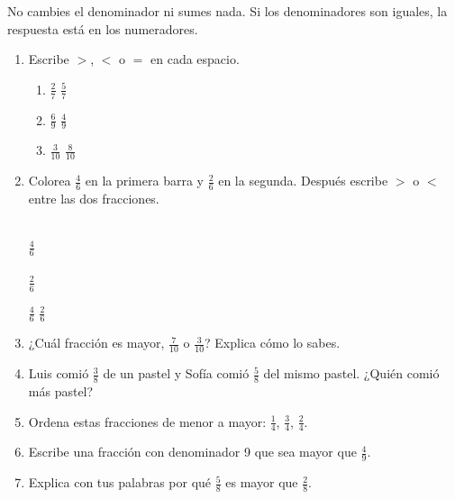 \begin{wbtip}
No cambies el denominador ni sumes nada. Si los denominadores son iguales, la respuesta está en los numeradores.
\end{wbtip}

\begin{wbpractice}
\begin{enumerate}
\item Escribe $>$, $<$ o $=$ en cada espacio.
  \begin{enumerate}
  \item $\frac{2}{7}$ \wbblank[1.5cm] $\frac{5}{7}$
  \item $\frac{6}{9}$ \wbblank[1.5cm] $\frac{4}{9}$
  \item $\frac{3}{10}$ \wbblank[1.5cm] $\frac{8}{10}$
  \end{enumerate}

\item Colorea $\frac{4}{6}$ en la primera barra y $\frac{2}{6}$ en la segunda. Después escribe $>$ o $<$ entre las dos fracciones.

\begin{center}
\\[1mm]
$\frac{4}{6}$\\[3mm]
\\[1mm]
$\frac{2}{6}$
\end{center}

$\frac{4}{6}$ \wbblank[1.5cm] $\frac{2}{6}$

\item ¿Cuál fracción es mayor, $\frac{7}{10}$ o $\frac{3}{10}$? Explica cómo lo sabes.

\item Luis comió $\frac{3}{8}$ de un pastel y Sofía comió $\frac{5}{8}$ del mismo pastel. ¿Quién comió más pastel?

\item Ordena estas fracciones de menor a mayor: $\frac{1}{4}$, $\frac{3}{4}$, $\frac{2}{4}$.

\item Escribe una fracción con denominador 9 que sea mayor que $\frac{4}{9}$.
\wbfracbox
{}

\item Explica con tus palabras por qué $\frac{5}{8}$ es mayor que $\frac{2}{8}$.
\end{enumerate}
\end{wbpractice}

